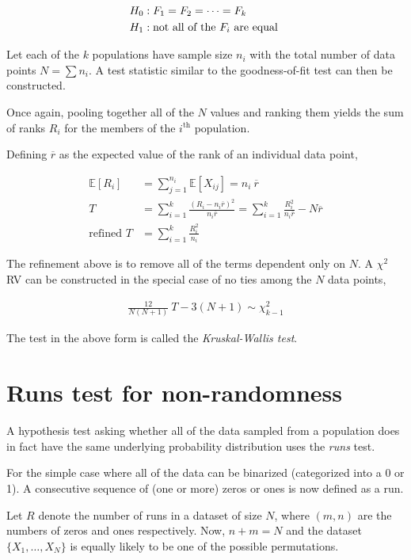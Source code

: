 \begin{align}
	H_0 &: F_1 = F_2 = \dots = F_k \nonumber \\
	H_1 &: \text{not all of the $ F_i $ are equal }
\end{align}


Let each of the $ k $ populations have sample size $ n_i $ with the total number of data points $ N = \sum n_i $. A test statistic similar to the goodness-of-fit test can then be constructed.

Once again, pooling together all of the $ N $ values and ranking them yields the sum of ranks $ R_i $ for the members of the $ i^{\text{th}} $ population.

Defining $ \overline{r} $ as the expected value of the rank of an individual data point,

\begin{align}
	\mathbb{E}[R_i] &= \sum\limits_{j = 1}^{n_i} \mathbb{E}[X_{ij}] = n_i\ \overline{r} \\
	T &= \sum\limits_{i=1}^{k} \frac{(R_i - n_i \overline{r})^2}{n_i \overline{r}} = \sum\limits_{i=1}^{k} \frac{R_i^2}{n_i \overline{r}} - N \overline{r} \\
	\text{refined } T &= \sum\limits_{i=1}^{k} \frac{R_i^2}{n_i}
\end{align}

The refinement above is to remove all of the terms dependent only on $ N $. A $ \chi^2 $ RV can be constructed in the special case of no ties among the $ N $ data points,

\begin{align}
	\frac{12}{N(N+1)} \ T - 3(N+1) \sim \chi^2_{k-1}
\end{align}

The test in the above form is called the \textit{Kruskal-Wallis test}.

\section{Runs test for non-randomness}

A hypothesis test asking whether all of the data sampled from a population does in fact have the same underlying probability distribution uses the \textit{runs} test.

For the simple case where all of the data can be binarized (categorized into a 0 or 1). A consecutive sequence of (one or more) zeros or ones is now defined as a run.

Let $ R $ denote the number of runs in a dataset of size $ N $, where $ (m, n) $ are the numbers of zeros and ones respectively. Now, $ n+m = N $ and the dataset $ \{X_1, \dots, X_N\} $ is equally likely to be one of the possible permutations.

